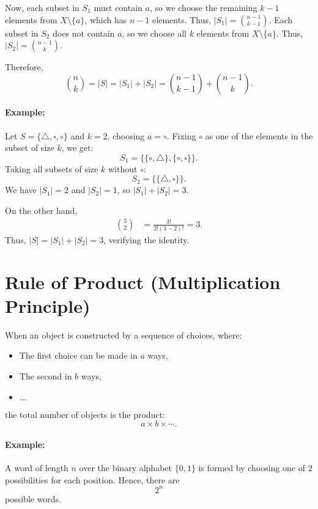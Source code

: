 Now,  
each subset in \( S_1 \) must contain \( a \), so we choose the remaining \( k-1 \) elements from \( X \setminus \{a\} \), which has \( n-1 \) elements. Thus, \( |S_1| = \binom{n-1}{k-1} \).  
Each subset in \( S_2 \) does not contain \( a \), so we choose all \( k \) elements from \( X \setminus \{a\} \). Thus, \( |S_2| = \binom{n-1}{k} \).  

Therefore,  
\[
\binom{n}{k} = |S| = |S_1| + |S_2| = \binom{n-1}{k-1} + \binom{n-1}{k}.
\]

\paragraph{Example:}  
Let \( S = \{ \triangle, \square, \circ \} \) and \( k = 2 \), choosing \( a = \circ \).  
Fixing \( \circ \) as one of the elements in the subset of size \( k \), we get:  
  \[
  S_1 = \{\{\circ, \triangle\}, \{\circ, \square\}\}.
  \]
Taking all subsets of size \( k \) without \( \circ \):  
  \[
  S_2 = \{\{\triangle, \square\}\}.
  \]
We have \( |S_1| = 2 \) and \( |S_2| = 1 \), so \( |S_1| + |S_2| = 3 \).  

\noindent On the other hand,  
\begin{align*}
\binom{3}{2} &= \frac{3!}{2!(3-2)!} = 3.
\end{align*}
Thus, \( |S| = |S_1| + |S_2| = 3 \), verifying the identity.  


\paragraph{}

\section{Rule of Product (Multiplication Principle)}
When an object is constructed by a sequence of choices, where:
\begin{itemize}[nosep]
    \item The first choice can be made in $a$ ways,
    \item The second in $b$ ways,
    \item $\ldots$
\end{itemize}
the total number of objects is the product:
\[
a \times b \times \cdots.
\]

\paragraph{Example:}  
A word of length $n$ over the binary alphabet $\{0,1\}$ is formed by choosing one of $2$ possibilities for each position. Hence, there are
\[
2^n
\]
possible words.

